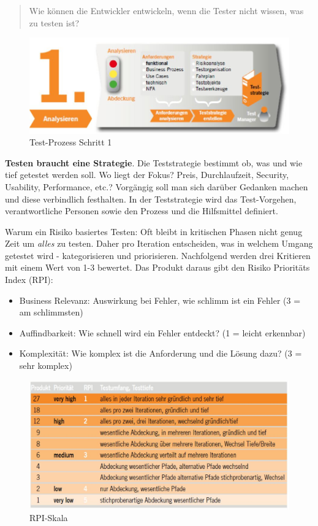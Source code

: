 \begin{quote}
	Wie können die Entwickler entwickeln, wenn die Tester nicht wissen, was zu testen ist?
\end{quote}


\begin{figure}[h!]
\centering
\includegraphics[width=0.7\linewidth]{fig/test-prozess-schritt-1}
\caption{Test-Prozess Schritt 1}
\label{fig:test-prozess-schritt-1}
\end{figure}

\textbf{Testen braucht eine Strategie}. Die Teststrategie bestimmt ob, was und wie tief getestet werden soll. Wo liegt der Fokus? Preis, Durchlaufzeit, Security, Usability, Performance, etc.? Vorgängig soll man sich darüber Gedanken machen und diese verbindlich festhalten. In der Teststrategie wird das Test-Vorgehen, verantwortliche Personen sowie den Prozess und die Hilfsmittel definiert. 

Warum ein Risiko basiertes Testen: Oft bleibt in kritischen Phasen nicht genug Zeit um \emph{alles} zu testen. Daher pro Iteration entscheiden, was in welchem Umgang getestet wird - kategorisieren und priorisieren. Nachfolgend werden drei Kritieren mit einem Wert von 1-3 bewertet. Das Produkt daraus gibt den Risiko Prioritäts Index (RPI):

\begin{itemize}
	\item Business Relevanz: Auswirkung bei Fehler, wie schlimm ist ein Fehler (3 = am schlimmsten)
	\item Auffindbarkeit: Wie schnell wird ein Fehler entdeckt? (1 = leicht erkennbar)
	\item Komplexität: Wie komplex ist die Anforderung und die Lösung dazu? (3 = sehr komplex)
\end{itemize}

\begin{figure}[h!]
\centering
\includegraphics[width=0.8\linewidth]{fig/rpi-skala}
\caption{RPI-Skala}
\label{fig:rpi-skala}
\end{figure}

